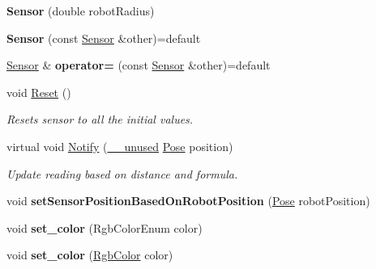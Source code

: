 \begin{DoxyCompactItemize}
\item 
{\bfseries Sensor} (double robot\+Radius)\hypertarget{classSensor_af302d96726e254b6df62817b88918da0}{}\label{classSensor_af302d96726e254b6df62817b88918da0}

\item 
{\bfseries Sensor} (const \hyperlink{classSensor}{Sensor} \&other)=default\hypertarget{classSensor_adbc07ea8f9861435f8e1d21b1078bd96}{}\label{classSensor_adbc07ea8f9861435f8e1d21b1078bd96}

\item 
\hyperlink{classSensor}{Sensor} \& {\bfseries operator=} (const \hyperlink{classSensor}{Sensor} \&other)=default\hypertarget{classSensor_a48b21cd29fa3f183a2fb9e6447de2219}{}\label{classSensor_a48b21cd29fa3f183a2fb9e6447de2219}

\item 
void \hyperlink{classSensor_ae7142e59234c594e21de26467733a279}{Reset} ()\hypertarget{classSensor_ae7142e59234c594e21de26467733a279}{}\label{classSensor_ae7142e59234c594e21de26467733a279}

\begin{DoxyCompactList}\small\item\em Resets sensor to all the initial values. \end{DoxyCompactList}\item 
virtual void \hyperlink{classSensor_afe05b95ae525d3b6b5fcce0b75739d70}{Notify} (\hyperlink{common_8h_a2e3484535ee610c8e19e9859563abe48}{\+\_\+\+\_\+unused} \hyperlink{structPose}{Pose} position)\hypertarget{classSensor_afe05b95ae525d3b6b5fcce0b75739d70}{}\label{classSensor_afe05b95ae525d3b6b5fcce0b75739d70}

\begin{DoxyCompactList}\small\item\em Update reading based on distance and formula. \end{DoxyCompactList}\item 
void {\bfseries set\+Sensor\+Position\+Based\+On\+Robot\+Position} (\hyperlink{structPose}{Pose} robot\+Position)\hypertarget{classSensor_adc2189cfa7e36e0c59479281443dfa03}{}\label{classSensor_adc2189cfa7e36e0c59479281443dfa03}

\item 
void {\bfseries set\+\_\+color} (Rgb\+Color\+Enum color)\hypertarget{classSensor_a92664d168b1da8f75701c56953954150}{}\label{classSensor_a92664d168b1da8f75701c56953954150}

\item 
void {\bfseries set\+\_\+color} (\hyperlink{structRgbColor}{Rgb\+Color} color)\hypertarget{classSensor_af89278d0fd4ec8ebbcfbe2d70709dda3}{}\label{classSensor_af89278d0fd4ec8ebbcfbe2d70709dda3}


\end{DoxyCompactItemize}
